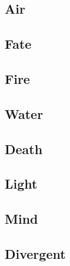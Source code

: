 \begin{multicols}{2}

\subsection{Air}



\subsection{Fate}

%

\subsection{Fire}

%

\subsection{Water}

%

\subsection{Death}



\subsection{Light}



\subsection{Mind}



\subsection{Divergent}



\end{multicols}
